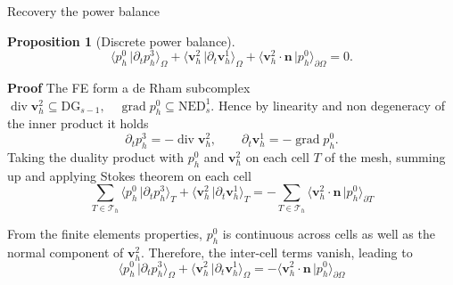 \documentclass[aspectratio=169]{beamer}
\DeclareMathOperator*{\grad}{grad}
\renewcommand{\div}{\operatorname{div}}
\newcommand{\dualpr}[3][]{\ensuremath{\langle #2 \, \vert #3 \rangle_{#1}}}
\newtheorem{proposition}{Proposition}
\begin{document}
\begin{frame}{Recovery the power balance}
	
	\begin{proposition}[Discrete power balance]
	\begin{equation*}
		\dualpr[\Omega]{p^{0}_h}{\partial_t p^3_h} + \dualpr[\Omega]{\bm{v}^{2}_h}{\partial_t \bm{v}^{1}_h} + \dualpr[\partial \Omega]{\bm{v}^2_h \cdot \bm{n}}{p_{h}^{0}} = 0.
	\end{equation*}
	\end{proposition}
\textbf{Proof} The FE form a de Rham subcomplex $\div \bm{v}^2_h \subseteq \mathrm{DG}_{s-1}, \quad \grad p_h^0 \subseteq \mathrm{NED}_s^1$. Hence by linearity and non degeneracy of the inner product it holds
\begin{equation*}
	\partial_t p_h^3 = -\div \bm{v}^2_h, \qquad \partial_t \bm{v}_h^1 = -\grad p_h^0.
\end{equation*}
	Taking the duality product with $p_h^0$ and $\bm{v}_h^2$ on each cell $T$ of the mesh, summing up and applying Stokes theorem on each cell
\begin{equation*}
	\sum_{T \in \mathcal{T}_h} \dualpr[T]{p_h^0}{\partial_t p_h^3} + \dualpr[T]{\bm{v}^{2}_h}{\partial_t \bm{v}^{1}_h} = -\sum_{T \in \mathcal{T}_h} \dualpr[\partial T]{\bm{v}^2_h \cdot \bm{n}}{p_h^0}
\end{equation*}

From the finite elements properties, $p_h^0$ is continuous across cells as well as the normal component of $\bm{v}^{2}_h$. Therefore, the inter-cell terms vanish, leading to
\begin{equation*}
	\dualpr[\Omega]{p_h^0}{\partial_t p_h^3} + \dualpr[\Omega]{\bm{v}^{2}_h}{\partial_t \bm{v}^{1}_h}  = - \dualpr[\partial \Omega]{\bm{v}^2_h \cdot \bm{n}}{p_h^0}
\end{equation*}

\end{frame}
\end{document}
